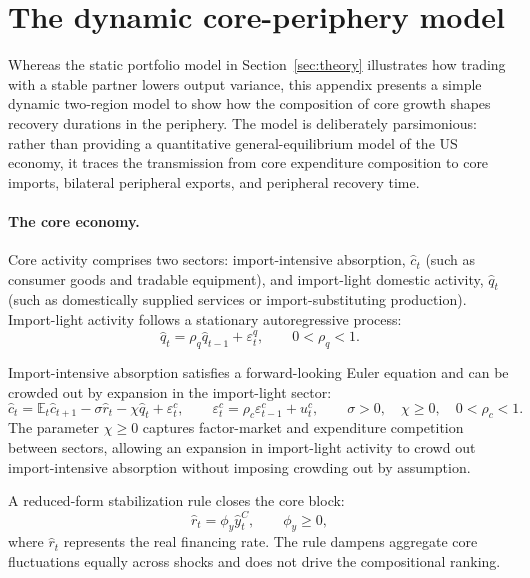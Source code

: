 \documentclass[12pt, a4paper]{article}
\begin{document}
\section{The dynamic core-periphery model}\label{app:model}

Whereas the static portfolio model in Section~\ref{sec:theory} illustrates how trading with a stable partner lowers output variance, this appendix presents a simple dynamic two-region model to show how the composition of core growth shapes recovery durations in the periphery. The model is deliberately parsimonious: rather than providing a quantitative general-equilibrium model of the US economy, it traces the transmission from core expenditure composition to core imports, bilateral peripheral exports, and peripheral recovery time.

\paragraph{The core economy.}
Core activity comprises two sectors: import-intensive absorption, $\hat c_t$ (such as consumer goods and tradable equipment), and import-light domestic activity, $\hat q_t$ (such as domestically supplied services or import-substituting production). Import-light activity follows a stationary autoregressive process:
\begin{equation}
    \hat q_t = \rho_q \hat q_{t-1} + \varepsilon_t^q,
    \qquad 0<\rho_q<1.
    \label{eq:q_process}
\end{equation}

Import-intensive absorption satisfies a forward-looking Euler equation and can be crowded out by expansion in the import-light sector:
\begin{equation}
    \hat c_t
    = \mathbb{E}_t \hat c_{t+1}
    - \sigma \hat r_t
    - \chi \hat q_t
    + \varepsilon_t^c,
    \qquad \varepsilon_t^c = \rho_c \varepsilon_{t-1}^c + u_t^c,
    \qquad \sigma>0,\quad \chi\geq0,\quad 0<\rho_c<1.
    \label{eq:core_absorption}
\end{equation}
The parameter $\chi \geq 0$ captures factor-market and expenditure competition between sectors, allowing an expansion in import-light activity to crowd out import-intensive absorption without imposing crowding out by assumption.

A reduced-form stabilization rule closes the core block:
\begin{equation}
    \hat r_t = \phi_y \hat y_t^{C},
    \qquad \phi_y\geq0,
    \label{eq:small_rule}
\end{equation}
where $\hat r_t$ represents the real financing rate. The rule dampens aggregate core fluctuations equally across shocks and does not drive the compositional ranking.
\end{document}
